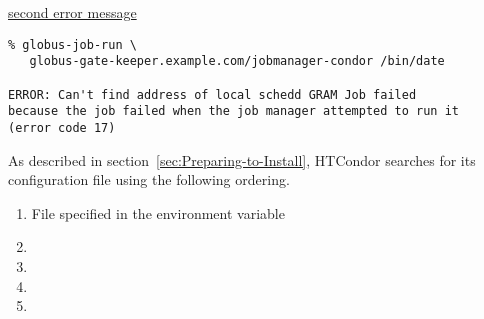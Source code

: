 \underline{second error message}
\footnotesize
\begin{verbatim}
% globus-job-run \
   globus-gate-keeper.example.com/jobmanager-condor /bin/date

ERROR: Can't find address of local schedd GRAM Job failed
because the job failed when the job manager attempted to run it
(error code 17)
\end{verbatim}
\normalsize

As described in
section~\ref{sec:Preparing-to-Install}, 
HTCondor searches for its configuration file using the following
ordering.
\begin{enumerate}
\item File specified in the  environment variable
\item {}
\item {}
\item {}
\item {}
\end{enumerate}

